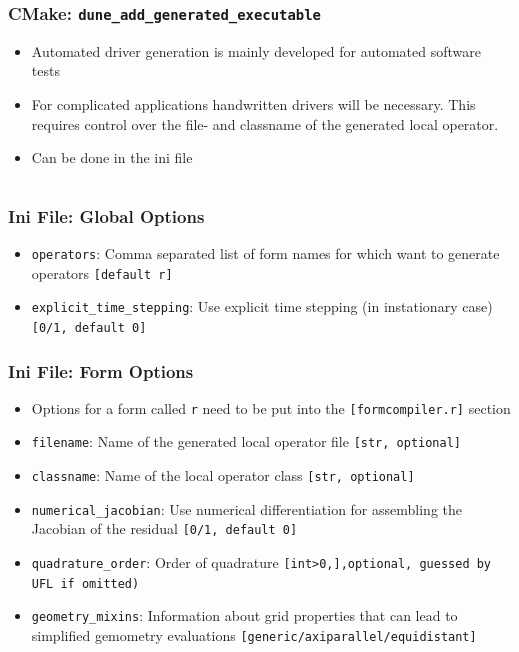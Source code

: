 \documentclass[aspectratio=169,11pt]{beamer}
\theoremstyle{definition}
\begin{document}
\begin{frame}[fragile]
  \frametitle{CMake: \lstinline{dune_add_generated_executable}}

  \begin{itemize}
  \item Automated driver generation is mainly developed for automated software
    tests
  \item For complicated applications handwritten drivers will be
    necessary. This requires control over the file- and classname of the
    generated local operator.
  \item Can be done in the ini file \vspace{0.3cm}
    \inputminted[fontsize=\scriptsize]{ini}{classname_filename.ini}
  \end{itemize}
\end{frame}

\begin{frame}[fragile]
  \frametitle{Ini File: Global Options}

  \begin{itemize}
  \item \lstinline{operators}: Comma separated list of form names for which
    want to generate operators \lstinline{[default r]}
  \item \lstinline{explicit_time_stepping}: Use explicit time stepping (in
    instationary case) \lstinline{[0/1, default 0]}
  \end{itemize}
\end{frame}

\begin{frame}[fragile]
  \frametitle{Ini File: Form Options}

  \begin{itemize}
  \item Options for a form called \lstinline{r} need to be put into the
    \lstinline{[formcompiler.r]} section
  \item \lstinline{filename}: Name of the generated local
    operator file \lstinline{[str, optional]}
  \item \lstinline{classname}: Name of the local operator class
    \lstinline{[str, optional]}
  \item \lstinline{numerical_jacobian}: Use numerical differentiation for
    assembling the Jacobian of the residual \lstinline{[0/1, default 0]}
  \item \lstinline{quadrature_order}: Order of quadrature \lstinline{[int>0,],optional, guessed by UFL if omitted)}
  \item \lstinline{geometry_mixins}: Information about grid properties that can
    lead to simplified gemometry evaluations
    \lstinline{[generic/axiparallel/equidistant]}
  \end{itemize}
\end{frame}
\end{document}
